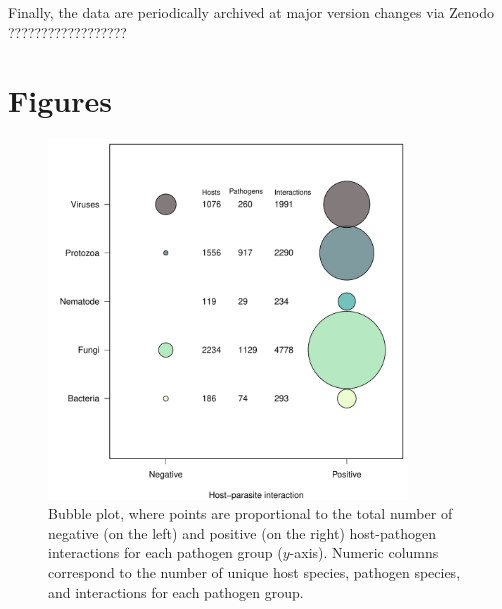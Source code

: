 \documentclass[12pt]{article}
\begin{document}
Finally, the data are periodically archived at major version changes via Zenodo ?????????????????? 
 















\clearpage


\clearpage


























\clearpage

\section*{Figures}

\begin{figure}[h!]
  \begin{center}
    \includegraphics[width=0.85\textwidth]{Figures/bubble.pdf}
    \caption{Bubble plot, where points are proportional to the total number of negative (on the left) and positive (on the right) host-pathogen interactions for each pathogen group ($y$-axis). Numeric columns correspond to the number of unique host species, pathogen species, and interactions for each pathogen group. }
    \label{fig:bubble}
  \end{center}
\end{figure}
\end{document}
